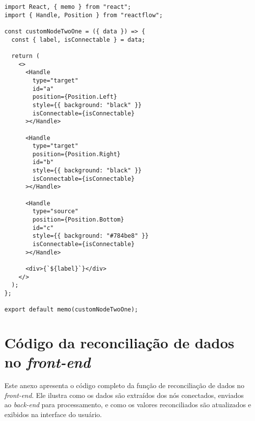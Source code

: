 \begin{verbatim}
import React, { memo } from "react";
import { Handle, Position } from "reactflow";

const customNodeTwoOne = ({ data }) => {
  const { label, isConnectable } = data;

  return (
    <>
      <Handle
        type="target"
        id="a"
        position={Position.Left}
        style={{ background: "black" }}
        isConnectable={isConnectable}
      ></Handle>

      <Handle
        type="target"
        position={Position.Right}
        id="b"
        style={{ background: "black" }}
        isConnectable={isConnectable}
      ></Handle>

      <Handle
        type="source"
        position={Position.Bottom}
        id="c"
        style={{ background: "#784be8" }}
        isConnectable={isConnectable}
      ></Handle>

      <div>{`${label}`}</div>
    </>
  );
};

export default memo(customNodeTwoOne);
\end{verbatim}

\chapter{Código da reconciliação de dados no \textit{front-end}}
\label{Cap:ReconcileDataCode}

Este anexo apresenta o código completo da função de reconciliação de dados no \textit{front-end}. Ele ilustra como os dados são extraídos dos nós conectados, enviados ao \textit{back-end} para processamento, e como os valores reconciliados são atualizados e exibidos na interface do usuário.


